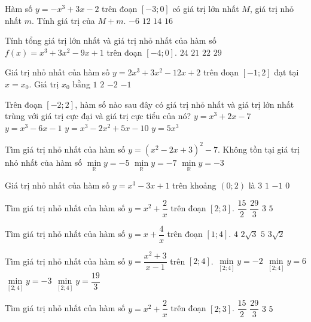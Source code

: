 \begin{ex}%
	Hàm số $y=-x^3+3x-2$ trên đoạn $[-3; 0]$ có giá trị lớn nhất $M$, giá trị nhỏ nhất $m$. Tính giá trị của $M+m$. 
	\choice
	{$-6$}
	{$12$}
	{\True $14$}
	{$16$}
\end{ex}
\begin{ex}%
	Tính tổng giá trị lớn nhất và giá trị nhỏ nhất của hàm số $f(x)=x^3+3x^2-9x+1$ trên đoạn $[-4;0]$. 
	\choice
	{$24$}
	{\True $21$}
	{$22$}
	{$29$}
\end{ex}
\begin{ex}%
	Giá trị nhỏ nhất của hàm số $y=2x^3+3x^2-12x+2$ trên đoạn $[-1;2]$ đạt tại $x=x_0$. Giá trị $x_0$ bằng
	\choice
	{$1$}
	{$2$}
	{$-2$}
	{\True $-1$}
\end{ex}
\begin{ex}%
	Trên đoạn $[-2;2]$, hàm số nào sau đây có giá trị nhỏ nhất và giá trị lớn nhất trùng với giá trị cực đại và giá trị cực tiểu của nó?
	\choice
	{\True $y=x^3+2x-7$}
	{$y=x^3-6x-1$}
	{$y=x^3-2x^2+5x-10$}
	{$y=5x^3$}
\end{ex}
\begin{ex}%
	Tìm giá trị nhỏ nhất của hàm số $y=\left(x^2-2x+3\right)^2-7$. 
	\choice
	{Không tồn tại giá trị nhỏ nhất của hàm số}
	{$\min\limits_{\mathbb{R}} y=-5$}
	{$\min\limits_{\mathbb{R}} y=-7$}
	{\True $\min\limits_{\mathbb{R}} y=-3$}
\end{ex}
\begin{ex}%
	Giá trị nhỏ nhất của hàm số $y=x^3-3x+1$ trên khoảng $(0;2)$ là
	\choice
	{$3$}
	{$1$}
	{\True $-1$}
	{$0$}
\end{ex}
\begin{ex}%
	Tìm giá trị nhỏ nhất của hàm số $y=x^2+\dfrac{2}{x}$ trên đoạn $[2;3]$. 
	\choice
	{$\dfrac{15}{2}$}
	{$\dfrac{29}{3}$}
	{$3$}
	{\True $5$}
\end{ex}
\begin{ex}%
	Tìm giá trị nhỏ nhất của hàm số $y=x+\dfrac{4}{x}$ trên đoạn $[1; 4]$.
	\choice
	{\True $4$}
	{$2\sqrt{3}$}
	{$5$}
	{$3\sqrt{2}$}
\end{ex}
\begin{ex}%
	Tìm giá trị nhỏ nhất của hàm số $y=\dfrac{x^2+3}{x-1}$ trên $[2;4]$. 
	\choice
	{$\min\limits_{[2;4]} y=-2$}
	{\True $\min\limits_{[2;4]} y=6$}
	{$\min\limits_{[2;4]} y=-3$}
	{$\min\limits_{[2;4]} y=\dfrac{19}{3}$}
\end{ex}
\begin{ex}%
	Tìm giá trị nhỏ nhất của hàm số $y=x^2+\dfrac{2}{x}$ trên đoạn $[2;3]$. 
	\choice
	{$\dfrac{15}{2}$}
	{$\dfrac{29}{3}$}
	{$3$}
	{\True $5$}
\end{ex}
